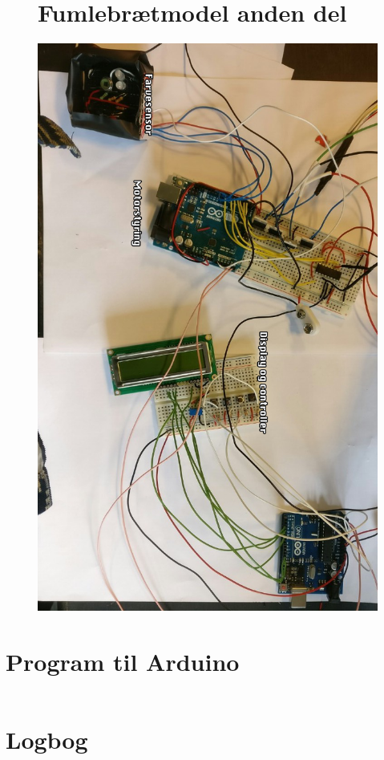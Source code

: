 \begin{figure}[H]
\section{Fumlebrætmodel anden del}
	\centering
    \includegraphics[width=13cm]{figures/2_5fremstilling/prototyper/rumleKreds.png}
\end{figure}

\section{Program til Arduino}
\label{bilag:program}
\begin{lstlisting}

\end{lstlisting}


\section{Logbog} 